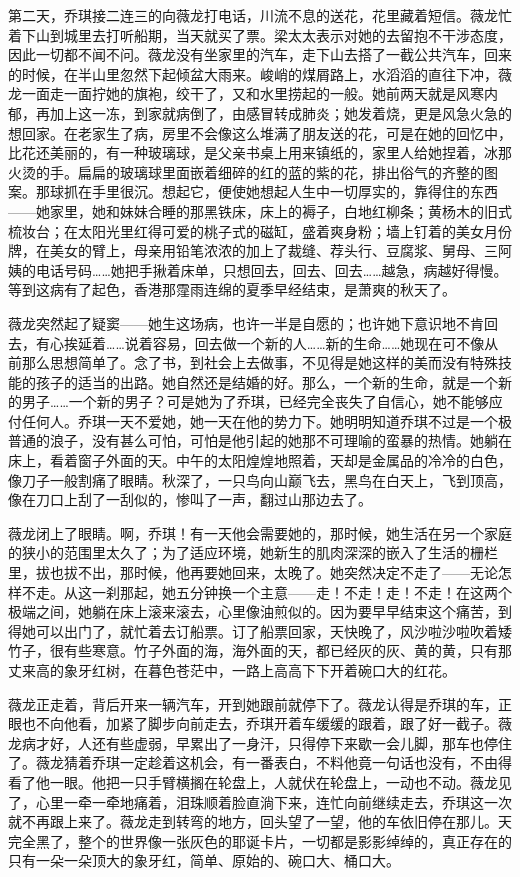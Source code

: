 \par 第二天，乔琪接二连三的向薇龙打电话，川流不息的送花，花里藏着短信。薇龙忙着下山到城里去打听船期，当天就买了票。梁太太表示对她的去留抱不干涉态度，因此一切都不闻不问。薇龙没有坐家里的汽车，走下山去搭了一截公共汽车，回来的时候，在半山里忽然下起倾盆大雨来。峻峭的煤屑路上，水滔滔的直往下冲，薇龙一面走一面拧她的旗袍，绞干了，又和水里捞起的一般。她前两天就是风寒内郁，再加上这一冻，到家就病倒了，由感冒转成肺炎；她发着烧，更是风急火急的想回家。在老家生了病，房里不会像这么堆满了朋友送的花，可是在她的回忆中，比花还美丽的，有一种玻璃球，是父亲书桌上用来镇纸的，家里人给她捏着，冰那火烫的手。扁扁的玻璃球里面嵌着细碎的红的蓝的紫的花，排出俗气的齐整的图案。那球抓在手里很沉。想起它，便使她想起人生中一切厚实的，靠得住的东西——她家里，她和妹妹合睡的那黑铁床，床上的褥子，白地红柳条；黄杨木的旧式梳妆台；在太阳光里红得可爱的桃子式的磁缸，盛着爽身粉；墙上钉着的美女月份牌，在美女的臂上，母亲用铅笔浓浓的加上了裁缝、荐头行、豆腐浆、舅母、三阿姨的电话号码……她把手揪着床单，只想回去，回去、回去……越急，病越好得慢。等到这病有了起色，香港那霪雨连绵的夏季早经结束，是萧爽的秋天了。
\par 薇龙突然起了疑窦——她生这场病，也许一半是自愿的；也许她下意识地不肯回去，有心挨延着……说着容易，回去做一个新的人……新的生命……她现在可不像从前那么思想简单了。念了书，到社会上去做事，不见得是她这样的美而没有特殊技能的孩子的适当的出路。她自然还是结婚的好。那么，一个新的生命，就是一个新的男子……一个新的男子？可是她为了乔琪，已经完全丧失了自信心，她不能够应付任何人。乔琪一天不爱她，她一天在他的势力下。她明明知道乔琪不过是一个极普通的浪子，没有甚么可怕，可怕是他引起的她那不可理喻的蛮暴的热情。她躺在床上，看着窗子外面的天。中午的太阳煌煌地照着，天却是金属品的冷冷的白色，像刀子一般割痛了眼睛。秋深了，一只鸟向山巅飞去，黑鸟在白天上，飞到顶高，像在刀口上刮了一刮似的，惨叫了一声，翻过山那边去了。
\par 薇龙闭上了眼睛。啊，乔琪！有一天他会需要她的，那时候，她生活在另一个家庭的狭小的范围里太久了；为了适应环境，她新生的肌肉深深的嵌入了生活的栅栏里，拔也拔不出，那时候，他再要她回来，太晚了。她突然决定不走了——无论怎样不走。从这一刹那起，她五分钟换一个主意——走！不走！走！不走！在这两个极端之间，她躺在床上滚来滚去，心里像油煎似的。因为要早早结束这个痛苦，到得她可以出门了，就忙着去订船票。订了船票回家，天快晚了，风沙啦沙啦吹着矮竹子，很有些寒意。竹子外面的海，海外面的天，都已经灰的灰、黄的黄，只有那丈来高的象牙红树，在暮色苍茫中，一路上高高下下开着碗口大的红花。
\par 薇龙正走着，背后开来一辆汽车，开到她跟前就停下了。薇龙认得是乔琪的车，正眼也不向他看，加紧了脚步向前走去，乔琪开着车缓缓的跟着，跟了好一截子。薇龙病才好，人还有些虚弱，早累出了一身汗，只得停下来歇一会儿脚，那车也停住了。薇龙猜着乔琪一定趁着这机会，有一番表白，不料他竟一句话也没有，不由得看了他一眼。他把一只手臂横搁在轮盘上，人就伏在轮盘上，一动也不动。薇龙见了，心里一牵一牵地痛着，泪珠顺着脸直淌下来，连忙向前继续走去，乔琪这一次就不再跟上来了。薇龙走到转弯的地方，回头望了一望，他的车依旧停在那儿。天完全黑了，整个的世界像一张灰色的耶诞卡片，一切都是影影绰绰的，真正存在的只有一朵一朵顶大的象牙红，简单、原始的、碗口大、桶口大。
